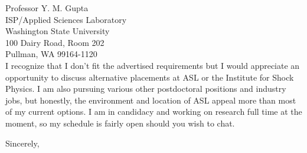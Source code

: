 \documentclass{letter} %
\begin{document}
\begin{letter}{
Professor Y. M. Gupta\\
ISP/Applied Sciences Laboratory\\
Washington State University\\
100 Dairy Road, Room 202\\
Pullman, WA 99164-1120\\
}
I recognize that I don't fit the advertised requirements but I would appreciate an opportunity to discuss alternative placements at ASL or the Institute for Shock Physics.
I am also pursuing various other postdoctoral positions and industry jobs, but honestly, the environment and location of ASL appeal 
more than most of my current options.
I am in candidacy and working on research full time at the moment, so my schedule is fairly open should you wish to chat.
 
 
 
\closing{Sincerely,} 
 

 

\end{letter}
 
\end{document}
